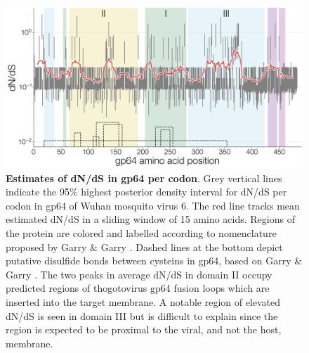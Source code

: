 \documentclass[11pt,twocolumn]{article}
\begin{document}
\begin{figure}
\centering
\includegraphics[width=\textwidth]{SuppFig5_sitewiseDNDS.png}
\caption{
\textbf{Estimates of dN/dS in gp64 per codon}.
Grey vertical lines indicate the 95\% highest posterior density interval for dN/dS per codon in gp64 of Wuhan mosquito virus 6.
The red line tracks mean estimated dN/dS in a sliding window of 15 amino acids.
Regions of the protein are colored and labelled according to nomenclature proposed by Garry \& Garry \citep{garry_proteomics_2008}.
Dashed lines at the bottom depict putative disulfide bonds between cysteins in gp64, based on Garry \& Garry \citep{garry_proteomics_2008}.
The two peaks in average dN/dS in domain II occupy predicted regions of thogotovirus gp64 fusion loops which are inserted into the target membrane.
A notable region of elevated dN/dS is seen in domain III but is difficult to explain since the region is expected to be proximal to the viral, and not the host, membrane.
}
\end{figure}
\end{document}
